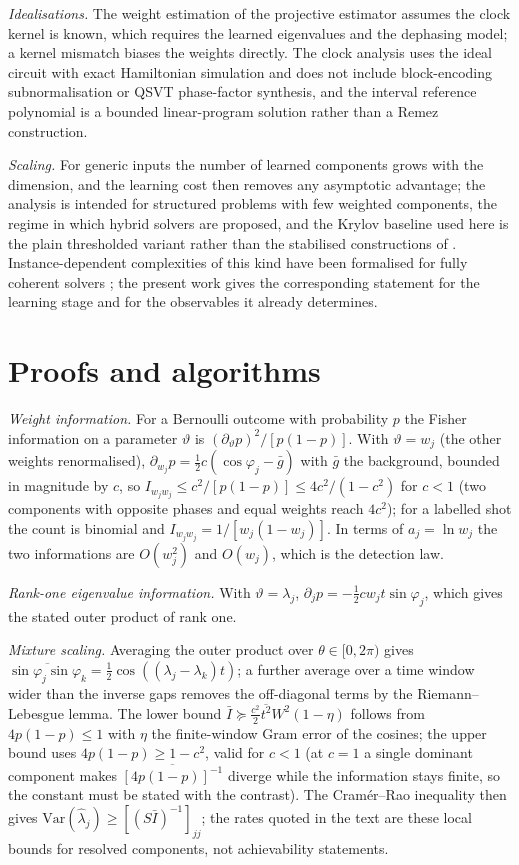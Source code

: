 \documentclass[journal]{IEEEtran}
\begin{document}
\emph{Idealisations.} The weight estimation of the projective estimator assumes the clock kernel is known, which requires the learned eigenvalues and the dephasing model; a kernel mismatch biases the weights directly. The clock analysis uses the ideal circuit with exact Hamiltonian simulation and does not include block-encoding subnormalisation or QSVT phase-factor synthesis, and the interval reference polynomial is a bounded linear-program solution rather than a Remez construction.

\emph{Scaling.} For generic inputs the number of learned components grows with the dimension, and the learning cost then removes any asymptotic advantage; the analysis is intended for structured problems with few weighted components, the regime in which hybrid solvers are proposed, and the Krylov baseline used here is the plain thresholded variant rather than the stabilised constructions of \cite{YuZhou2026,Park2026}. Instance-dependent complexities of this kind have been formalised for fully coherent solvers \cite{Dalzell2026}; the present work gives the corresponding statement for the learning stage and for the observables it already determines.

\appendices
\section{Proofs and algorithms}
\label{app:proofs}

\emph{Weight information.} For a Bernoulli outcome with probability $p$ the Fisher information on a parameter $\vartheta$ is $(\partial_\vartheta p)^2/[p(1-p)]$. With $\vartheta=w_j$ (the other weights renormalised), $\partial_{w_j}p=\tfrac12c(\cos\varphi_j-\bar g)$ with $\bar g$ the background, bounded in magnitude by $c$, so $I_{w_jw_j}\le c^2/[p(1-p)]\le4c^2/(1-c^2)$ for $c<1$ (two components with opposite phases and equal weights reach $4c^2$); for a labelled shot the count is binomial and $I_{w_jw_j}=1/[w_j(1-w_j)]$. In terms of $a_j=\ln w_j$ the two informations are $O(w_j^2)$ and $O(w_j)$, which is the detection law.

\emph{Rank-one eigenvalue information.} With $\vartheta=\lambda_j$, $\partial_jp=-\tfrac12cw_jt\sin\varphi_j$, which gives the stated outer product of rank one.

\emph{Mixture scaling.} Averaging the outer product over $\theta\in[0,2\pi)$ gives $\overline{\sin\varphi_j\sin\varphi_k}=\tfrac12\cos((\lambda_j-\lambda_k)t)$; a further average over a time window wider than the inverse gaps removes the off-diagonal terms by the Riemann--Lebesgue lemma. The lower bound $\bar I\succeq\tfrac{c^2}{2}\overline{t^2}W^2(1-\eta)$ follows from $4p(1-p)\le1$ with $\eta$ the finite-window Gram error of the cosines; the upper bound uses $4p(1-p)\ge1-c^2$, valid for $c<1$ (at $c=1$ a single dominant component makes $\overline{[4p(1-p)]^{-1}}$ diverge while the information stays finite, so the constant must be stated with the contrast). The Cram\'er--Rao inequality then gives $\mathrm{Var}(\hat\lambda_j)\ge[(S\bar I)^{-1}]_{jj}$; the rates quoted in the text are these local bounds for resolved components, not achievability statements.
\end{document}
